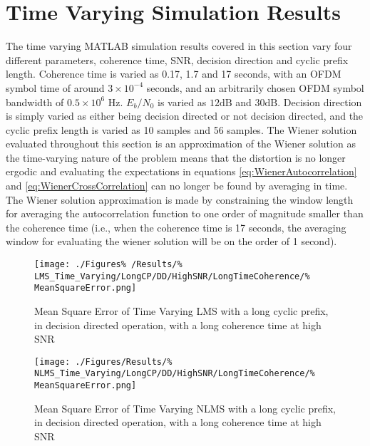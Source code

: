 \section{Time Varying Simulation Results}
\label{sec:TVResults}
The time varying MATLAB simulation results covered in this section %
vary four different parameters, coherence time, SNR, decision %
direction and cyclic prefix length. Coherence time is varied as %
0.17, 1.7 and 17 seconds, with an OFDM symbol time of around %
$3 \times 10^{-4}$ seconds, and an arbitrarily chosen OFDM symbol %
bandwidth of $0.5 \times 10^{6}$ Hz. $E_b/N_0$ is varied as %
$12\text{dB}$ and %
$30\text{dB}$. Decision direction is simply varied as either %
being decision directed or not decision directed, and the cyclic %
prefix length is varied as 10 samples and 56 samples. The Wiener %
solution evaluated throughout this section is an approximation %
of the Wiener solution as the time-varying nature of the problem %
means that the distortion is no longer ergodic and evaluating the %
expectations in equations \ref{eq:WienerAutocorrelation} and %
\ref{eq:WienerCrossCorrelation} can no longer be found by %
averaging in time. The Wiener solution approximation is made %
by constraining the window length for averaging the %
autocorrelation function to one order of magnitude smaller %
than the coherence time (i.e., when the coherence time is 17 %
seconds, the averaging window for evaluating the wiener solution %
will be on the order of 1 second).
\begin{figure}[ht]
	\centering
	\begin{minipage}{0.49\textwidth}
		\centering
		\texttt{[image: ./Figures\%
		/Results/\%
	LMS\_Time\_Varying/LongCP/DD/HighSNR/LongTimeCoherence/\%
	MeanSquareError.png]}
		\captionsetup{width=0.75\linewidth}
		\caption{Mean Square Error of Time Varying LMS with 
		a long cyclic prefix, in decision directed operation,
		with a long coherence time at high SNR}
	\end{minipage}
	\begin{minipage}{0.49\textwidth}
		\centering
		\texttt{[image: ./Figures/Results/\%
	NLMS\_Time\_Varying/LongCP/DD/HighSNR/LongTimeCoherence/\%
	MeanSquareError.png]}
		\captionsetup{width=0.75\linewidth}
		\caption{Mean Square Error of Time Varying NLMS with 
		a long cyclic prefix, in decision directed operation,
		with a long coherence time at high SNR}
	\end{minipage}
\end{figure}
